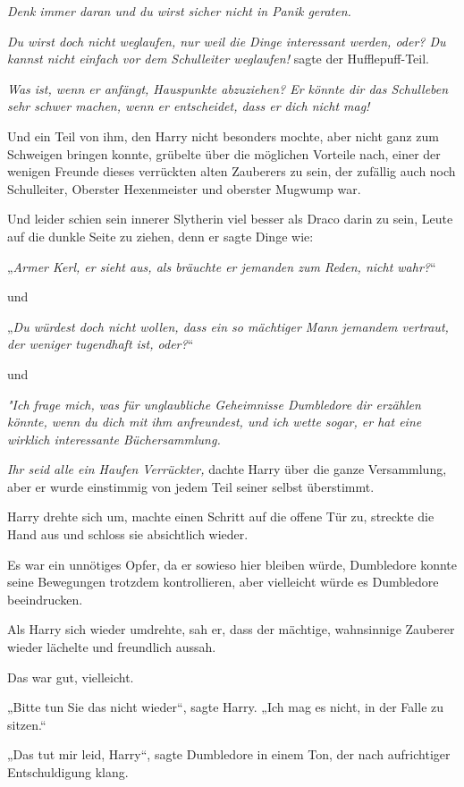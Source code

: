 {\emph{Denk immer daran und du wirst sicher nicht in Panik geraten.}

\emph{Du wirst doch nicht weglaufen, nur weil die Dinge interessant werden, oder? Du kannst nicht einfach vor dem Schulleiter weglaufen!} sagte der Hufflepuff-Teil.

\emph{Was ist, wenn er anfängt, Hauspunkte abzuziehen? Er könnte dir das Schulleben sehr schwer machen, wenn er entscheidet, dass er dich nicht mag!}

Und ein Teil von ihm, den Harry nicht besonders mochte, aber nicht ganz zum Schweigen bringen konnte, grübelte über die möglichen Vorteile nach, einer der wenigen Freunde dieses verrückten alten Zauberers zu sein, der zufällig auch noch Schulleiter, Oberster Hexenmeister und oberster Mugwump war.

Und leider schien sein innerer Slytherin viel besser als Draco darin zu sein, Leute auf die dunkle Seite zu ziehen, denn er sagte Dinge wie:

„\emph{Armer Kerl, er sieht aus, als bräuchte er jemanden zum Reden, nicht wahr?}“

und

„\emph{Du würdest doch nicht wollen, dass ein so mächtiger Mann jemandem vertraut, der weniger tugendhaft ist, oder?}“

und

\emph{"Ich frage mich, was für unglaubliche Geheimnisse Dumbledore dir erzählen könnte, wenn du dich mit ihm anfreundest, und ich wette sogar, er hat eine wirklich interessante Büchersammlung.}

\emph{Ihr seid alle ein Haufen Verrückter,} dachte Harry über die ganze Versammlung, aber er wurde einstimmig von jedem Teil seiner selbst überstimmt.

Harry drehte sich um, machte einen Schritt auf die offene Tür zu, streckte die Hand aus und schloss sie absichtlich wieder.

Es war ein unnötiges Opfer, da er sowieso hier bleiben würde, Dumbledore konnte seine Bewegungen trotzdem kontrollieren, aber vielleicht würde es Dumbledore beeindrucken.

Als Harry sich wieder umdrehte, sah er, dass der mächtige, wahnsinnige Zauberer wieder lächelte und freundlich aussah.

Das war gut, vielleicht.

„Bitte tun Sie das nicht wieder“, sagte Harry. „Ich mag es nicht, in der Falle zu sitzen.“

„Das tut mir leid, Harry“, sagte Dumbledore in einem Ton, der nach aufrichtiger Entschuldigung klang.

}

